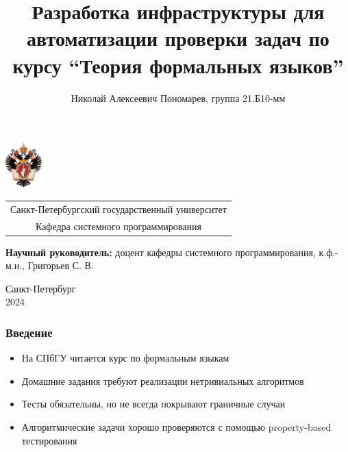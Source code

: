 \documentclass[aspectratio=169]{beamer}
\title[Инфраструктура тестирования]{Разработка инфраструктуры для автоматизации проверки задач по курсу \enquote{Теория формальных языков}}
\institute[СПбГУ]{}
\author[Николай Пономарев]{Николай Алексеевич Пономарев, группа 21.Б10-мм}
\begin{document}
{
\begin{frame}
	\includegraphics[width=1.4cm]{pictures/SPbGU_Logo.png}
	\vspace{-35pt}
	\hspace{-10pt}
	\begin{center}
		\begin{tabular}{c}
			\scriptsize{Санкт-Петербургский государственный университет} \\
			\scriptsize{Кафедра системного программирования}
		\end{tabular}
		\titlepage
	\end{center}

	\btVFill

	{\scriptsize
		\textbf{Научный руководитель:} доцент кафедры системного программирования, к.ф.-м.н., Григорьев С. В. \\
	}
	\begin{center}
		\vspace{5pt}
		\scriptsize{Санкт-Петербург\\
			2024}
	\end{center}

\end{frame}
}

\begin{frame}
	\frametitle{Введение}
	\begin{itemize}
		\item На СПбГУ читается курс по формальным языкам
		\item Домашние задания требуют реализации нетривиальных алгоритмов
		\item Тесты обязательны, но не всегда покрывают граничные случаи
		\item Алгоритмические задачи хорошо проверяются с помощью property-based тестирования
	\end{itemize}
\end{frame}
\end{document}
